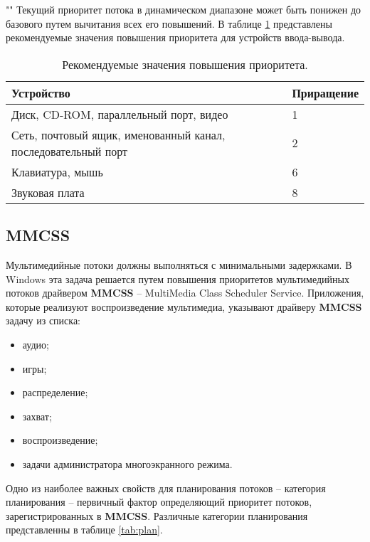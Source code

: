 ""\newline 
\noindent Текущий приоритет потока в динамическом диапазоне может быть понижен до базового путем вычитания всех его повышений. В таблице \ref{tab:io} представлены рекомендуемые значения повышения приоритета для устройств ввода-вывода.

\begin{table}[h]
    \caption{Рекомендуемые значения повышения приоритета.}
    \begin{center}
        \begin{tabular}{|p{100mm}|l|}
            \hline
            \textbf{Устройство} & \textbf{Приращение} \\
            \hline
            Диск, CD-ROM, параллельный порт, видео & 1 \\
            \hline
            Сеть, почтовый ящик, именованный канал, последовательный порт & 2 \\
            \hline
            Клавиатура, мышь & 6 \\
            \hline
            Звуковая плата & 8 \\
            \hline
        \end{tabular}
    \end{center}
    \label{tab:io}
\end{table}

\subsection{MMCSS}

Мультимедийные потоки должны выполняться с минимальными задержками. В Windows эта задача решается путем повышения приоритетов мультимедийных потоков драйвером \textbf{MMCSS} -- MultiMedia Class Scheduler Service. Приложения, которые реализуют воспроизведение мультимедиа, указывают драйверу \textbf{MMCSS} задачу из списка:

\begin{itemize}
	\item аудио;
	\item игры;
	\item распределение;
	\item захват;
	\item воспроизведение;
	\item задачи администратора многоэкранного режима.
\end{itemize}

Одно из наиболее важных свойств для планирования потоков -- категория планирования -- первичный фактор определяющий приоритет потоков, зарегистрированных в \textbf{MMCSS}. Различные категории планирования представленны в таблице \ref{tab:plan}.

